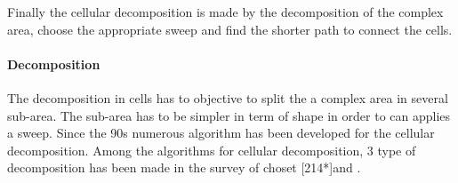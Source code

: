  Finally the cellular decomposition is made by the decomposition of the complex area, choose the appropriate  sweep and find the shorter path to connect the cells. 
 
 \paragraph*{Decomposition}\label{par:decomposition}

 The decomposition in cells has to objective to split the a complex area in several sub-area. The sub-area has to be simpler in term of shape in order to can applies a sweep. 
Since the 90s numerous algorithm has been developed for the cellular decomposition. Among the algorithms for cellular decomposition, 3 type of decomposition has been made in the survey of choset [214*]and \cite{66*galceran2013}. 
